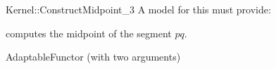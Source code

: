 \begin{ccRefFunctionObjectConcept}{Kernel::ConstructMidpoint_3}
A model for this must provide:


 {computes the midpoint of the segment $pq$.}

\ccRefines
AdaptableFunctor (with two arguments)

\ccSeeAlso
{} \\

\end{ccRefFunctionObjectConcept}
